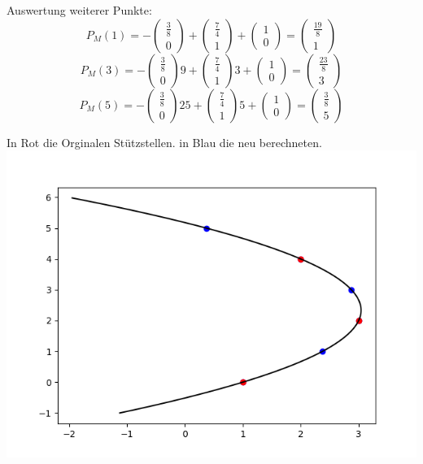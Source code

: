 Auswertung weiterer Punkte:
$$P_{M}(1) = -\begin{pmatrix}\frac{3}{8}\\0\end{pmatrix} + \begin{pmatrix}\frac{7}{4}\\1\end{pmatrix} + \begin{pmatrix}1\\0\end{pmatrix} = \begin{pmatrix}\frac{19}{8}\\1\end{pmatrix}  $$
$$P_{M}(3) = -\begin{pmatrix}\frac{3}{8}\\0\end{pmatrix}9 + \begin{pmatrix}\frac{7}{4}\\1\end{pmatrix}3 + \begin{pmatrix}1\\0\end{pmatrix} =  \begin{pmatrix}\frac{23}{8}\\3\end{pmatrix}$$ 
$$P_{M}(5) = -\begin{pmatrix}\frac{3}{8}\\0\end{pmatrix}25 + \begin{pmatrix}\frac{7}{4}\\1\end{pmatrix}5 + \begin{pmatrix}1\\0\end{pmatrix} =  \begin{pmatrix}\frac{3}{8}\\5\end{pmatrix}$$ 

In Rot die Orginalen Stützstellen. in Blau die neu berechneten.\\
\includegraphics[width=\linewidth]{1a}

